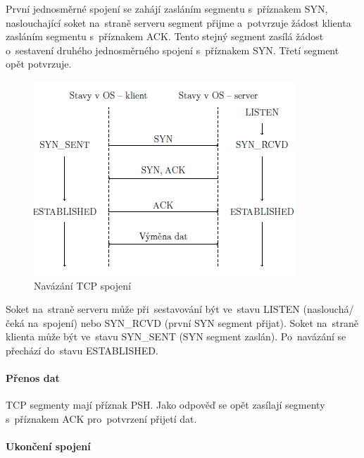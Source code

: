 První jednosměrné spojení se zahájí zasláním segmentu s~příznakem SYN, naslouchající soket na~straně serveru segment přijme a~potvrzuje žádost klienta zasláním segmentu s~příznakem ACK. Tento stejný segment zasílá žádost o~sestavení druhého jednosměrného spojení s~příznakem SYN. Třetí segment opět potvrzuje.

\begin{figure}[ht]
	\centering
	\includegraphics[scale=1]{images/network_three_handshake.png}
	\caption{Navázání TCP spojení}
	\label{network_three_handshake}
\end{figure}

Soket na~straně serveru může při~sestavování být ve~stavu LISTEN (naslouchá/čeká na~spojení) nebo SYN\_RCVD (první SYN segment přijat). Soket na~straně klienta může být ve~stavu SYN\_SENT (SYN segment zaslán). Po~navázání se přechází do~stavu ESTABLISHED.

\paragraph{Přenos dat}

TCP segmenty mají příznak PSH. Jako odpověď se opět zasílají segmenty s~příznakem ACK pro~potvrzení přijetí dat.

\paragraph{Ukončení spojení}

